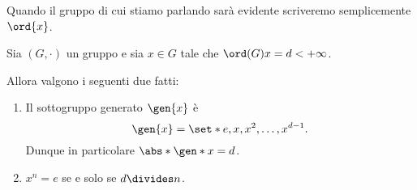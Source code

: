Quando il gruppo di cui stiamo parlando sarà evidente scriveremo semplicemente $\ord{x}$.

\begin{proposition}
     \label{prop:sgr_generato}
    Sia $(G, \cdot)$ un gruppo e sia $x \in G$ tale che $\ord(G){x} = d < +\infty$. 

    Allora valgono i seguenti due fatti:
    \begin{enumerate}[label={(\roman*)}, ref={\theproposition: (\roman*)}]
        \item \label{prop:sgr_generato:expr} Il sottogruppo generato $\gen{x}$ è \[
            \gen{x} = \set*{e, x, x^2, \dots, x^{d-1}}.    
        \] Dunque in particolare $\abs*{\gen* x} = d$.
        \item \label{prop:sgr_generato:ord_div_n} $x^n = e$ se e solo se $d \divides n$.
    \end{enumerate}
\end{proposition}
